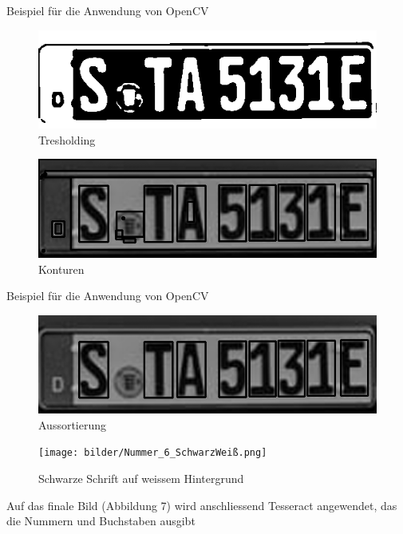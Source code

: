 \begin{frame}{Beispiel für die Anwendung von OpenCV}

\begin{figure}
\begin{center}
\includegraphics[scale=0.25]{bilder/Nummer_3_treshold.png}
\caption{Tresholding}
\label{Tresholding}
\end{center}
\end{figure}

\begin{figure}
\begin{center}
\includegraphics[scale=0.25]{bilder/Nummer_4_Konturen.png}
\caption{Konturen}
\label{Konturen}
\end{center}
\end{figure}

\end{frame}

\begin{frame}{Beispiel für die Anwendung von OpenCV}

\begin{figure}
\begin{center}
\includegraphics[scale=0.25]{bilder/Nummer_5_Aussortieren.png}
\caption{Aussortierung}
\label{Aussortierung}
\end{center}
\end{figure}

\begin{figure}
\begin{center}
\texttt{[image: bilder/Nummer\_6\_SchwarzWeiß.png]}
\caption{Schwarze Schrift auf weissem Hintergrund}
\label{SchwarzWeiss}
\end{center}
\end{figure}

Auf das finale Bild (Abbildung 7) wird anschliessend Tesseract angewendet, das die Nummern und Buchstaben ausgibt
\end{frame}